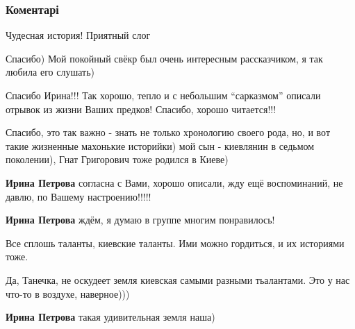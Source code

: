  
 
 
 
 
\subsubsection{Коментарі}

\begin{itemize} %
Чудесная история!
Приятный слог

\begin{itemize} %
Спасибо) Мой покойный свёкр был очень интересным рассказчиком, я так любила его слушать)
\end{itemize} %


Спасибо Ирина!!! Так хорошо, тепло и с небольшим \enquote{сарказмом} описали отрывок
из жизни Ваших предков! Спасибо, хорошо читается!!!

\begin{itemize} %

Спасибо, это так важно - знать не только хронологию своего рода, но, и вот
такие жизненные махонькие историйки) мой сын - киевлянин в седьмом поколении),
Гнат Григорович тоже родился в Киеве)

\textbf{Ирина Петрова} согласна с Вами, хорошо описали, жду ещё воспоминаний, не давлю, по Вашему настроению!!!!!

\textbf{Ирина Петрова} ждём, я думаю в группе многим понравилось!
\end{itemize} %

Все сплошь таланты, киевские таланты. Ими можно гордиться, и их историями тоже.

\begin{itemize} %

Да, Танечка, не оскудеет земля киевская самыми разными тьалантами. Это у нас
что-то в воздухе, наверное)))

\textbf{Ирина Петрова} такая удивительная земля наша)
\end{itemize} %


\end{itemize}
